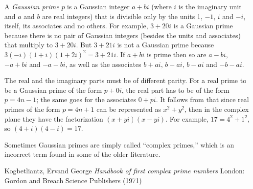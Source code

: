 \documentclass[12pt]{article}
\begin{document}
A {\em Gaussian prime} $p$ is a Gaussian integer $a + bi$ (where $i$ is the imaginary unit and $a$ and $b$ are real integers) that is divisible only by the units 1, $-1$, $i$ and $-i$, itself, its associates and no others. For example, $3 + 20i$ is a Gaussian prime because there is no pair of Gaussian integers (besides the units and associates) that multiply to $3 + 20i$. But $3 + 21i$ is not a Gaussian prime because $3(-i)(1 + i)(1 + 2i)^2 = 3 + 21i$. If $a + bi$ is prime then so are $a - bi$, $-a + bi$ and $-a - bi$, as well as the associates $b + ai$, $b - ai$, $b - ai$ and $-b - ai$.

The real and the imaginary parts must be of different parity. For a real prime to be a Gaussian prime of the form $p + 0i$, the real part has to be of the form $p = 4n - 1$; the same goes for the associates $0 + pi$. It follows from  that since real primes of the form $p = 4n + 1$ can be represented as $x^2 + y^2$, then in the complex plane they have the factorization $(x + yi)(x - yi)$. For example, $17 = 4^2 + 1^2$, so $(4 + i)(4 - i) = 17$.

Sometimes Gaussian primes are simply called ``complex primes,'' which is an incorrect term found in some of the older literature.

\begin{thebibliography}{1}
 Kogbetliantz, Ervand George {\it Handbook of first complex prime numbers} London: Gordon and Breach Science Publishers (1971)
\end{thebibliography}
\end{document}
